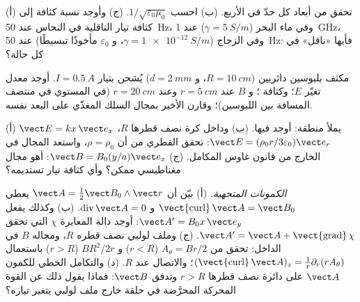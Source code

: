 \begin{exercise}[$\star$]\label{exo:b2:maxwell-equations:2}
(أ) تحقق من أبعاد كل حدّ في  الأربع.
(ب) احسب $1/\sqrt{\varepsilon_0\mu_0}$. (ج) وأوجد نسبة كثافة 
إلى كثافة تيار الناقلية في النحاس عند \qty{50}{Hz}، وفي
ماء البحر ($\gamma = \qty{5}{S/m}$) عند \qty{1}{GHz}، وفي الزجاج ($\gamma =
\qty{1e-12}{S/m}$، و $\varepsilon_0$ مأخوذًا تبسيطًا) عند \qty{50}{Hz}: فأيها
«ناقل» في كل حالة؟
\end{exercise}

\begin{exercise}[$\star$]\label{exo:b2:maxwell-equations:3}
مكثف بلبوسين دائريين ($R = \qty{10}{cm}$، و $d = \qty{2}{mm}$) يُشحن
بتيار $I = \qty{0.5}{A}$. أوجد معدل تغيّر $E$؛ وكثافة ؛ و $B$ عند $r = \qty{5}{cm}$ وعند $r = \qty{20}{cm}$ (في
المستوي في منتصف المسافة بين اللبوسين)؛ وقارن الأخير بمجال
السلك المغذّي على البعد نفسه.
\end{exercise}

\begin{exercise}[$\star$]\label{exo:b2:maxwell-equations:4}
(أ) $\vect E = kx\,\vect e_x$ يملأ منطقة: أوجد  فيها. (ب)
وداخل كرة نصف قطرها $R$، $\vect E = (\rho_0r/3\varepsilon_0)\vect e_r$: تحقق 
القطري من أن $\rho = \rho_0$، واستعد المجال في الخارج
من قانون غاوس المكامل. (ج) $\vect B = B_0(y/a)\vect e_x$: أهو مجال مغناطيسي
ممكن؟ وأي كثافة تيار تستديمه؟
\end{exercise}

\begin{exercise}[$\star\star$]\label{exo:b2:maxwell-equations:5}
\emph{الكمونات المتجهية.} (أ) بيّن أن $\vect A = \tfrac12\vect B_0\wedge\vect r$
يعطي $\operatorname{\vect{curl}}\vect A = \vect B_0$ و $\operatorname{div}\vect A = 0$.
(ب) وكذلك يفعل $\vect A' = B_0x\,\vect e_y$: أوجد دالة المعايرة $\chi$ التي تحقق
$\vect A' = \vect A + \operatorname{\vect{grad}}\chi$. (ج) وملف لولبي نصف قطره $R$،
ومجاله $B$ في الداخل: تحقق من $A_\theta = Br/2$ ($r < R$) و $BR^2/2r$ ($r > R$)
باستعمال $(\operatorname{\vect{curl}}\vect A)_z = \frac1r\partial_r(rA_\theta)$؛ والاتصال عند $R$.
(د) والتكامل الخطي للكمون $\vect A$ على دائرة نصف قطرها $r > R$ وتدفق
$\vect B$: فماذا يقول ذلك عن القوة المحركة المحرَّضة في حلقة خارج
ملف لولبي يتغير تياره؟
\end{exercise}

